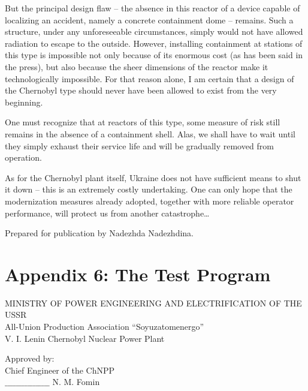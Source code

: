 \documentclass[openright]{bookest}
\begin{document}
But the principal design flaw -- the absence in this reactor of a device capable of localizing an accident, namely a concrete containment dome -- remains. Such a structure, under any unforeseeable circumstances, simply would not have allowed radiation to escape to the outside. However, installing containment at stations of this type is impossible not only because of its enormous cost (as has been said in the press), but also because the sheer dimensions of the reactor make it technologically impossible. For that reason alone, I am certain that a design of the Chernobyl type should never have been allowed to exist from the very beginning.

One must recognize that at reactors of this type, some measure of risk still remains in the absence of a containment shell. Alas, we shall have to wait until they simply exhaust their service life and will be gradually removed from operation.

As for the Chernobyl plant itself, Ukraine does not have sufficient means to shut it down -- this is an extremely costly undertaking. One can only hope that the modernization measures already adopted, together with more reliable operator performance, will protect us from another catastrophe\ldots

\medskip

\begin{flushright}
Prepared for publication by Nadezhda Nadezhdina.
\end{flushright}

\chapter*{Appendix 6: The Test Program}

\begin{center}
MINISTRY OF POWER ENGINEERING AND ELECTRIFICATION OF THE USSR \\
All-Union Production Association ``Soyuzatomenergo'' \\
V. I. Lenin Chernobyl Nuclear Power Plant
\end{center}

\begin{flushright}
Approved by: \\
Chief Engineer of the ChNPP \\
$\_\_\_\_\_\_\_\_\_\_\_\_\_\_\_\_$ N. M. Fomin
\end{flushright}
\end{document}
